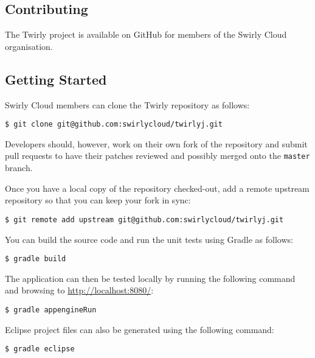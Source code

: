 \documentclass[11pt,a4paper]{article}
\newcommand{\scorg}{Swirly Cloud\cite{swirlycloud:github}}
\newcommand{\twirly}{Twirly\cite{twirly}}
\begin{document}
\begin{appendices}

\section{Contributing}

The \twirly{} project is available on GitHub\cite{github} for members of the \scorg{} organisation.

\subsection{Getting Started}

\scorg{} members can clone the \twirly{} repository as follows:

\lstset{language=sh}
\begin{lstlisting}
$ git clone git@github.com:swirlycloud/twirlyj.git 
\end{lstlisting}

Developers should, however, work on their own fork of the repository and submit pull requests to
have their patches reviewed and possibly merged onto the \texttt{master} branch.

Once you have a local copy of the repository checked-out, add a remote upstream repository so that
you can keep your fork in sync:

\lstset{language=sh}
\begin{lstlisting}
$ git remote add upstream git@github.com:swirlycloud/twirlyj.git
\end{lstlisting}

You can build the source code and run the unit tests using Gradle\cite{gradle} as follows:

\lstset{language=sh}
\begin{lstlisting}
$ gradle build
\end{lstlisting}

The application can then be tested locally by running the following command and browsing to
\url{http://localhost:8080/}:

\lstset{language=sh}
\begin{lstlisting}
$ gradle appengineRun
\end{lstlisting}

Eclipse\cite{eclipse} project files can also be generated using the following command:

\lstset{language=sh}
\begin{lstlisting}
$ gradle eclipse
\end{lstlisting}


\end{appendices}
\end{document}
